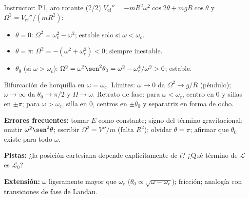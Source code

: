 \documentclass[spanish]{beamer}
\newcommand{\Lag}{\mathcal{L}}               %
\begin{document}
\begin{frame}{Instructor: P1, aro rotante (2/2)}
\scriptsize
$V_{\mathrm{ef}}''=-mR^2\omega^2\cos2\theta+mgR\cos\theta$ y $\Omega^2=V_{\mathrm{ef}}''/(mR^2)$:
\begin{itemize}
  \item $\theta=0$: $\Omega^2=\omega_c^2-\omega^2$; estable solo si $\omega<\omega_c$.
  \item $\theta=\pi$: $\Omega^2=-(\omega^2+\omega_c^2)<0$; siempre inestable.
  \item $\theta_0$ (si $\omega>\omega_c$): $\Omega^2=\omega^2\sen^2\theta_0=\omega^2-\omega_c^4/\omega^2>0$; estable.
\end{itemize}
Bifurcación de horquilla en $\omega=\omega_c$. Límites: $\omega\to0$ da $\Omega^2\to g/R$
(péndulo); $\omega\to\infty$ da $\theta_0\to\pi/2$ y $\Omega\to\omega$.
Retrato de fase: para $\omega<\omega_c$, centro en $0$ y sillas en $\pm\pi$; para
$\omega>\omega_c$, silla en $0$, centros en $\pm\theta_0$ y separatriz en forma de ocho.

\medskip
\textbf{Errores frecuentes:} tomar $E$ como constante; signo del término gravitacional;
omitir $\omega^2\sen^2\theta$; escribir $\Omega^2=V''/m$ (falta $R^2$); olvidar $\theta=\pi$;
afirmar que $\theta_0$ existe para todo $\omega$.

\textbf{Pistas:} ¿la posición cartesiana depende explícitamente de $t$?
¿Qué término de $\Lag$ es $\Lag_0$?

\textbf{Extensión:} $\omega$ ligeramente mayor que $\omega_c$ ($\theta_0\propto\sqrt{\omega-\omega_c}$);
fricción; analogía con transiciones de fase de Landau.
\end{frame}
\end{document}
